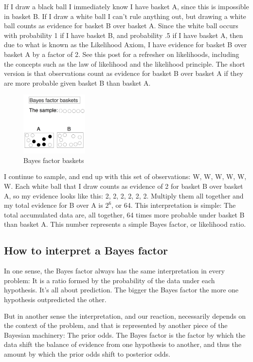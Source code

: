 If I draw a black ball I immediately know I have basket A, since this is impossible in basket B. If I draw a white ball I can't rule anything out, but drawing a white ball counts as evidence for basket B over basket A. Since the white ball occurs with probability 1 if I have basket B, and probability .5 if I have basket A, then due to what is known as the Likelihood Axiom, I have evidence for basket B over basket A by a factor of 2.  See this post for a refresher on likelihoods, including the concepts such as the law of likelihood and the likelihood principle. The short version is that observations count as evidence for basket B over basket A if they are more probable given basket B than basket A.

\begin{figure}[h]
\centering
\includegraphics[width=0.3\textwidth]{pic/p05c03-snip18.png}
\caption{Bayes factor baskets}
\label{fig:p05c03-snip18}
\end{figure}

I continue to sample, and end up with this set of observations: {W, W, W, W, W, W}. Each white ball that I draw counts as evidence of 2 for basket B over basket A, so my evidence looks like this: {2, 2, 2, 2, 2, 2}. Multiply them all together and my total evidence for B over A is $2^6$, or 64. This interpretation is simple: The total accumulated data are, all together, 64 times more probable under basket B than basket A. This number represents a simple Bayes factor, or likelihood ratio.

\subsection{How to interpret a Bayes factor}

In one sense, the Bayes factor always has the same interpretation in every problem: It is a ratio formed by the probability of the data under each hypothesis. It's all about prediction. The bigger the Bayes factor the more one hypothesis outpredicted the other.

But in another sense the interpretation, and our reaction, necessarily depends on the context of the problem, and that is represented by another piece of the Bayesian machinery: The prior odds. The Bayes factor is the factor by which the data shift the balance of evidence from one hypothesis to another, and thus the amount by which the prior odds shift to posterior odds.

